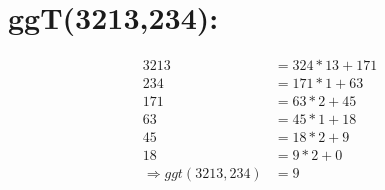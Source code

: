 \documentclass[11pt,a4paper]{article}
\begin{document}
\section{} %

\section{ggT(3213,234):} %
\begin{align*}
3213 &= 324 * 13 + 171\\
234 &= 171 * 1 + 63\\
171 &= 63 * 2 + 45\\
63 &= 45 * 1 + 18\\
45 &= 18 * 2 + 9\\
18 &= 9 * 2 + 0\\
\Rightarrow ggt(3213,234) &= 9
\end{align*}

\section{} %
\end{document}
